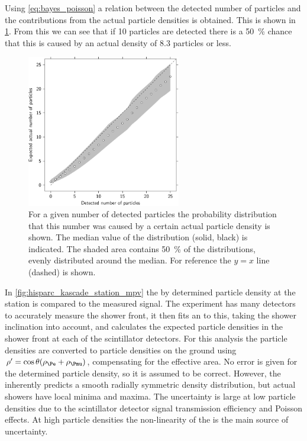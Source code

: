 Using \cref{eq:bayes_poisson} a relation between the detected number of particles and the contributions from the actual particle densities is obtained. This is shown in \cref{fig:poisson_ranges}. From this we can see that if \num{10} particles are detected there is a \SI{50}{\percent} chance that this is caused by an actual density of \num{8.3} particles or less.

\begin{figure}
    \centering
    \includegraphics[width=0.6\textwidth]
                    {plots/station/poisson_ranges}
    \caption{For a given number of detected particles the probability distribution that this number was caused by a certain actual particle density is shown. The median value of the distribution (solid, black) is indicated. The shaded area contains \SI{50}{\percent} of the distributions, evenly distributed around the median. For reference the $y = x$ line (dashed) is shown.}
    \label{fig:poisson_ranges}
\end{figure}

In \cref{fig:hisparc_kascade_station_mpv} the by \kascade determined particle density at the station is compared to the measured signal. The \kascade experiment has many detectors to accurately measure the shower front, it then fits an \ldf to this, taking the shower inclination into account, and calculates the expected particle densities in the shower front at each of the \hisparc scintillator detectors. For this analysis the particle densities are converted to particle densities on the ground using $\rho^\prime = \cos\theta(\rho_{\Pe} + \rho_{\Pmu})$, compensating for the effective area. No error is given for the \kascade determined particle density, so it is assumed to be correct. However, the \ldf inherently predicts a smooth radially symmetric density distribution, but actual showers have local minima and maxima. The uncertainty is large at low particle densities due to the scintillator detector signal transmission efficiency and Poisson effects. At high particle densities the non-linearity of the \pmt is the main source of uncertainty.

